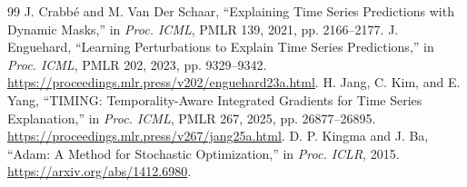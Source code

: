 \documentclass[conference]{IEEEtran}
\begin{document}
\begin{thebibliography}{99}
 J. Crabb\'e and M. Van Der Schaar, ``Explaining Time Series Predictions with Dynamic Masks,'' in \emph{Proc. ICML}, PMLR 139, 2021, pp. 2166--2177.
 J. Enguehard, ``Learning Perturbations to Explain Time Series Predictions,'' in \emph{Proc. ICML}, PMLR 202, 2023, pp. 9329--9342. \url{https://proceedings.mlr.press/v202/enguehard23a.html}.
 H. Jang, C. Kim, and E. Yang, ``TIMING: Temporality-Aware Integrated Gradients for Time Series Explanation,'' in \emph{Proc. ICML}, PMLR 267, 2025, pp. 26877--26895. \url{https://proceedings.mlr.press/v267/jang25a.html}.
 D. P. Kingma and J. Ba, ``Adam: A Method for Stochastic Optimization,'' in \emph{Proc. ICLR}, 2015. \url{https://arxiv.org/abs/1412.6980}.
\end{thebibliography}
\end{document}
